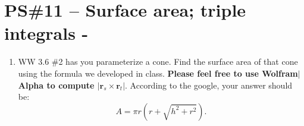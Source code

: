 


%


\allowdisplaybreaks
\section{PS\#11 -- Surface area; triple integrals -  }

\begin{enumerate}[leftmargin=0pt]
    
    \item WW 3.6 \#2 has you parameterize a cone. Find the surface area of that cone using the formula we developed in class. 
    \textbf{Please feel free to use Wolfram$|$Alpha to compute $\left|\mathbf{r}_s \times \mathbf{r}_t\right|$}. According to the google, your answer should be:
    \[A = \pi r \left(r+\sqrt{h^2+r^2}\right).\]
    

\end{enumerate}
